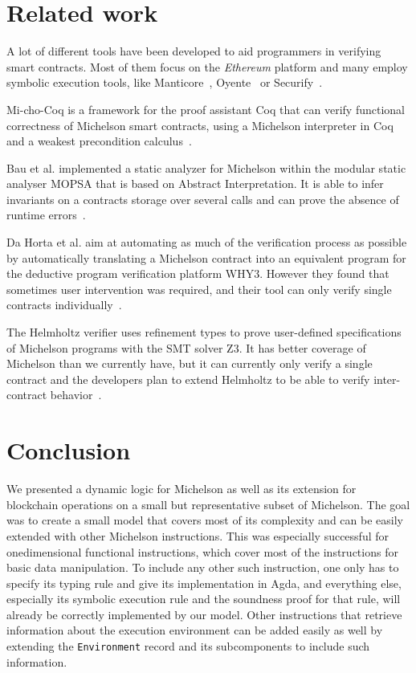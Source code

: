 \section{Related work}
\label{sec:related-work}
A lot of different tools have been developed to aid programmers in verifying smart contracts.
Most of them focus on the \emph{Ethereum} platform and many employ symbolic execution tools,
like Manticore~\cite{manticore}, Oyente~\cite{oyente} or Securify~\cite{securify}.

Mi-cho-Coq is a framework for the proof assistant Coq that can verify
functional correctness of Michelson smart contracts,
using a Michelson interpreter in Coq and a weakest precondition calculus~\cite{mi-cho-coq}.

Bau et al. implemented a static analyzer for Michelson
within the modular static analyser MOPSA that is based on Abstract Interpretation.
It is able to infer invariants on a contracts storage over several calls
and can prove the absence of runtime errors~\cite{abstract-interpretation}.

Da Horta et al. aim at automating as much of the verification process as possible
by automatically translating a Michelson contract into an equivalent program
for the deductive program verification platform WHY3.
However they found that sometimes user intervention was required,
and their tool can only verify single contracts individually~\cite{why3}.

The Helmholtz verifier uses refinement types to prove
user-defined specifications of Michelson programs with the SMT solver Z3.
It has better coverage of Michelson than we currently have,
but it can currently only verify a single contract
and the developers plan to extend Helmholtz
to be able to verify inter-contract behavior~\cite{helmholtz}.



\section{Conclusion}

We presented a dynamic logic for Michelson as well as its extension for blockchain operations
on a small but representative subset of Michelson.
The goal was to create a small model that covers most of its complexity
and can be easily extended with other Michelson instructions.
This was especially successful for onedimensional functional instructions,
which cover most of the instructions for basic data manipulation.
To include any other such instruction,
one only has to specify its typing rule and give its implementation in Agda,
and everything else, especially its symbolic execution rule and the soundness proof for that rule,
will already be correctly implemented by our model.
Other instructions that retrieve information about the execution environment can be added
easily as well by extending the \verb/Environment/ record and its subcomponents
to include such information.

